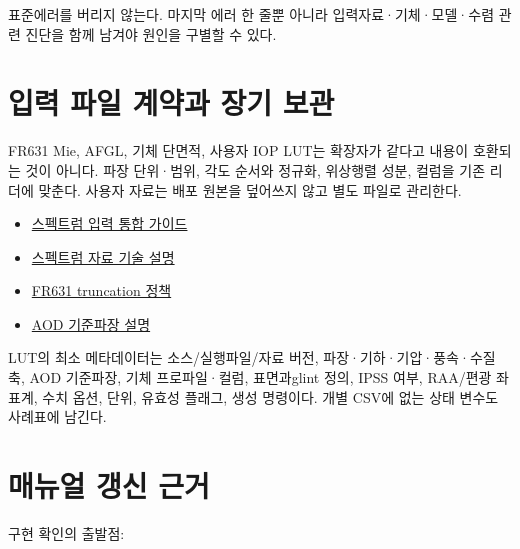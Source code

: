 표준에러를 버리지 않는다. 마지막 에러 한 줄뿐 아니라 입력자료·기체·모델·수렴 관련 진단을 함께 남겨야 원인을 구별할 수 있다.

\section{입력 파일 계약과 장기 보관}
\label{sec:auto:07_validation_notes:4}
FR631 Mie, AFGL, 기체 단면적, 사용자 IOP LUT는 확장자가 같다고 내용이 호환되는 것이 아니다. 파장 단위·범위, 각도 순서와 정규화, 위상행렬 성분, 컬럼을 기존 리더에 맞춘다. 사용자 자료는 배포 원본을 덮어쓰지 않고 별도 파일로 관리한다.

\begin{itemize}
\item \href{https://github.com/brtnt/OCRT/blob/54861c68e35ec5aaa3938fad53e93dc2dfa7eb1d/code/OCRT_C/docs/OCRT_330_1100_FR631_INTEGRATION_GUIDE_KO.md}{스펙트럼 입력 통합 가이드}
\item \href{https://github.com/brtnt/OCRT/blob/54861c68e35ec5aaa3938fad53e93dc2dfa7eb1d/code/OCRT_C/docs/OCRT_330_1100_FR631_SPECTRAL_DATA_TECHNICAL_NOTE_KO.md}{스펙트럼 자료 기술 설명}
\item \href{https://github.com/brtnt/OCRT/blob/54861c68e35ec5aaa3938fad53e93dc2dfa7eb1d/code/OCRT_C/docs/OCRT_MIE_GRID_TRUNCATION_AND_VALIDATION_ARTIFACT_POLICY_2026-08-21.md}{FR631 truncation 정책}
\item \href{https://github.com/brtnt/OCRT/blob/54861c68e35ec5aaa3938fad53e93dc2dfa7eb1d/code/OCRT_C/docs/OCRT_AOD_REFERENCE_WAVELENGTH_KO.md}{AOD 기준파장 설명}
\end{itemize}

LUT의 최소 메타데이터는 소스/실행파일/자료 버전, 파장·기하·기압·풍속·수질 축, AOD 기준파장, 기체 프로파일·컬럼, 표면과glint 정의, IPSS 여부, RAA/편광 좌표계, 수치 옵션, 단위, 유효성 플래그, 생성 명령이다. 개별 CSV에 없는 상태 변수도 사례표에 남긴다.

\section{매뉴얼 갱신 근거}
\label{sec:auto:07_validation_notes:5}
구현 확인의 출발점:

